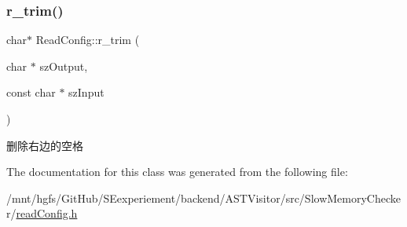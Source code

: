 \subsubsection{\texorpdfstring{r\+\_\+trim()}{r\_trim()}}
{\footnotesize\ttfamily char$\ast$ Read\+Config\+::r\+\_\+trim (\begin{DoxyParamCaption}\item[{char $\ast$}]{sz\+Output,  }\item[{const char $\ast$}]{sz\+Input }\end{DoxyParamCaption})\hspace{0.3cm}{\ttfamily [inline]}}

删除右边的空格 

The documentation for this class was generated from the following file\+:\begin{DoxyCompactItemize}
\item 
/mnt/hgfs/\+Git\+Hub/\+S\+Eexperiement/backend/\+A\+S\+T\+Visitor/src/\+Slow\+Memory\+Checker/\hyperlink{readConfig_8h}{read\+Config.\+h}\end{DoxyCompactItemize}
